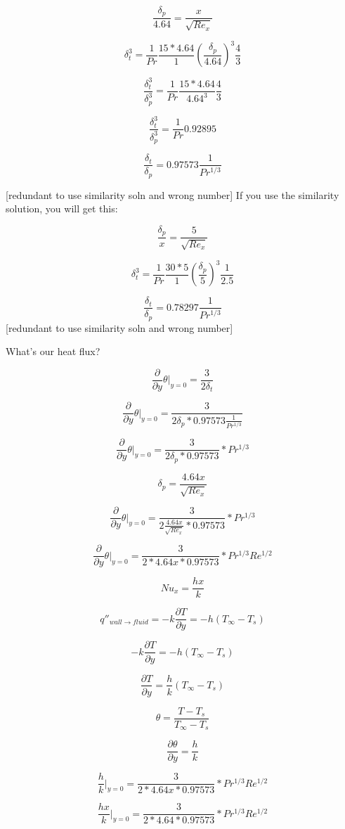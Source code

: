 \documentclass[11pt]{article}
\begin{document}
$$\frac{\delta_p}{4.64} = \frac{x}{\sqrt{Re_x}}$$


$$\delta_t^3 =  \frac{1}{Pr} \frac{15*4.64}{1} (\frac{\delta_p}{4.64} )^3  \frac{4}{3} $$


$$\frac{\delta_t^3}{\delta_p^3} = \frac{1}{Pr} \frac{15*4.64}{4.64^3} \frac{4}{3}$$

$$\frac{\delta_t^3}{\delta_p^3} = \frac{1}{Pr} 0.92895$$

$$\frac{\delta_t}{\delta_p} = 0.97573 \frac{1}{Pr^{1/3}}$$


[redundant to use similarity soln and wrong number]
If you use the similarity solution, you will get this:

$$\frac{\delta_p}{x} = \frac{5}{\sqrt{Re_x}}$$


$$\delta_t^3 =  \frac{1}{Pr} \frac{30*5}{1} (\frac{\delta_p}{5} )^3   \frac{1}{2.5}  $$

$$\frac{\delta_t}{\delta_p} = 0.78297 \frac{1}{Pr^{1/3}}$$
[redundant to use similarity soln and wrong number]

What's our heat flux?


$$\frac{\partial}{\partial y} \theta |_{y=0} = \frac{3}{2 \delta_t}$$

$$\frac{\partial}{\partial y} \theta |_{y=0} = \frac{3}{2 \delta_p *0.97573 \frac{1}{Pr^{1/3}}}$$


$$\frac{\partial}{\partial y} \theta |_{y=0} = \frac{3}{2 \delta_p *0.97573} * Pr^{1/3}$$


$$\delta_p = \frac{4.64 x}{\sqrt{Re_x}}$$

$$\frac{\partial}{\partial y} \theta |_{y=0} = \frac{3}{2 \frac{4.64 x}{\sqrt{Re_x}} *0.97573} * Pr^{1/3}$$

$$\frac{\partial}{\partial y} \theta |_{y=0} = \frac{3}{2 *4.64 x *0.97573} * Pr^{1/3} Re^{1/2}$$

$$Nu_x = \frac{h x}{k}$$

$$q''_{wall \rightarrow fluid} = -k \frac{\partial T}{\partial y}=-h(T_\infty-T_s)$$

$$-k \frac{\partial T}{\partial y}=-h(T_\infty-T_s)$$

$$\frac{\partial T}{\partial y} = \frac{h}{k}(T_\infty-T_s)$$

$$\theta = \frac{T-T_s}{T_\infty - T_s}$$

$$\frac{\partial \theta}{\partial y} = \frac{h}{k}$$

$$\frac{h}{k}  |_{y=0} = \frac{3}{2 *4.64 x *0.97573} * Pr^{1/3} Re^{1/2}$$

$$\frac{hx}{k}  |_{y=0} = \frac{3}{2 *4.64 *0.97573} * Pr^{1/3} Re^{1/2}$$
\end{document}
